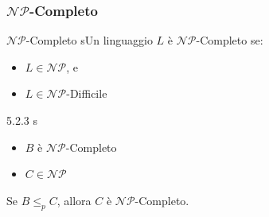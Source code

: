 \documentclass{article}  %
\theoremstyle{definition}
\begin{document}
\subsubsection{$\mathcal{NP}$-Completo}
\begin{theorem}{$\mathcal{NP}$-Completo}
	sUn linguaggio $L$ è $\mathcal{NP}$-Completo se:
	\begin{itemize}
		\item $L \in \mathcal{NP}$, e
		\item $L \in \mathcal{NP}$-Difficile
	\end{itemize}
\end{theorem}
\begin{theorem}{5.2.3}
	s
	\begin{itemize}
		\item $B$ è $\mathcal{NP}$-Completo
		\item $C \in \mathcal{NP}$
	\end{itemize}
	Se $B \leq_p C$, allora $C$ è $\mathcal{NP}$-Completo.
\end{theorem}


\end{document}

